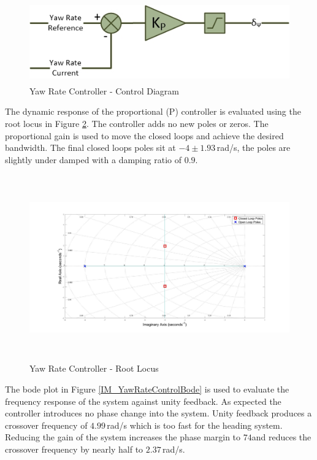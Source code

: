 \documentclass[12pt]{report}
\begin{document}
\begin{figure}[H]
	\centering
	\includegraphics[height = 3.5cm]{../References/Diagrams/YawRateController.jpg}
	\caption{Yaw Rate Controller -  Control Diagram}
	\label{IM_YawRateController}
\end{figure}

The dynamic response of the proportional (P) controller is evaluated using the root locus in Figure \ref{IM_YawRateControlRoot}. The controller adds no new poles or zeros. The proportional gain is used to move the closed loops and achieve the desired bandwidth. The final closed loops poles sit at $-4 \pm 1.93$\,rad/s, the poles are slightly under damped with a damping ratio of $0.9$.

\begin{figure}[H]
	\centering
	\includegraphics[height = 8cm]{../Design/Matlab/Controllers/yaw_rate_root.jpg}
	\caption{Yaw Rate Controller -  Root Locus}
	\label{IM_YawRateControlRoot}
\end{figure}

The bode plot in Figure \ref{IM_YawRateControlBode} is used to evaluate the frequency response of the system against unity feedback. As expected the controller introduces no phase change into the system. Unity feedback produces a crossover frequency of $4.99$\,rad/s which is too fast for the heading system. Reducing the gain of the system increases the phase margin to $74$\textdegree and reduces the crossover frequency by nearly half to $2.37$\,rad/s.
\end{document}
